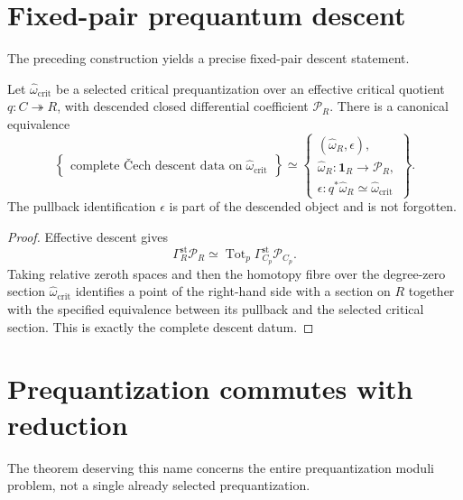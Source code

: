 \section{Fixed-pair prequantum descent}
\label{sec:prequantum-fixed-pair-descent}

The preceding construction yields a precise fixed-pair descent statement.

\begin{theorem}
\label{thm:prequantum-fixed-critical-prequantization-descent}
Let $\widehat\omega_{\mathrm{crit}}$ be a selected critical prequantization over an
effective critical quotient $q:C\twoheadrightarrow R$, with descended closed
differential coefficient $\mathscr P_R$.  There is a canonical equivalence
\[
\boxed{
\left\{
\begin{array}{c}
\text{complete \v{C}ech descent data on}\;
\widehat\omega_{\mathrm{crit}}
\end{array}
\right\}
\simeq
\left\{
\begin{array}{c}
(\widehat\omega_R,\epsilon),\\
\widehat\omega_R:\mathbf1_R\to\mathscr P_R,\\
\epsilon:q^*\widehat\omega_R\simeq
\widehat\omega_{\mathrm{crit}}
\end{array}
\right\}.
}
\]
The pullback identification $\epsilon$ is part of the descended object and is not
forgotten.
\end{theorem}

\begin{proof}
Effective descent gives
\[
\Gamma_R^{\mathrm{st}}\mathscr P_R
\simeq
\operatorname{Tot}_{p}
\Gamma_{C_p}^{\mathrm{st}}\mathscr P_{C_p}.
\]
Taking relative zeroth spaces and then the homotopy fibre over the degree-zero
section $\widehat\omega_{\mathrm{crit}}$ identifies a point of the right-hand side
with a section on $R$ together with the specified equivalence between its pullback
and the selected critical section.  This is exactly the complete descent datum.
\end{proof}

\section{Prequantization commutes with reduction}
\label{sec:prequantum-commutes-reduction}

The theorem deserving this name concerns the entire prequantization moduli problem,
not a single already selected prequantization.

